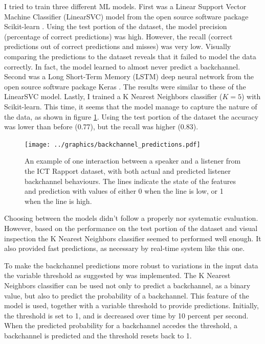 \documentclass[]{simple-thesis}
\begin{document}
I tried to train three different ML models.
First was a Linear Support Vector Machine Classifier (LinearSVC) model from the open source software package Scikit-learn \citep{Pedregosa2011}.
Using the test portion of the dataset, the model precision (percentage of correct predictions) was high.
However, the recall (correct predictions out of correct predictions and misses) was very low.
Visually comparing the predictions to the dataset reveals that it failed to model the data correctly.
In fact, the model learned to almost never predict a backchannel.
Second was a Long Short-Term Memory (LSTM) deep neural network from the open source software package Keras \citep{Chollet2015}.
The results were similar to these of the LinearSVC model.
Lastly, I trained a K Nearest Neighbors classifier ($K = 5$) with Scikit-learn.
This time, it seems that the model manage to capture the nature of the data, as shown in figure \ref{fig:system:backchannel_predictions}.
Using the test portion of the dataset the accuracy was lower than before (0.77), but the recall was higher (0.83).

\begin{figure}
  \texttt{[image: ../graphics/backchannel\_predictions.pdf]}
  \caption{An example of one interaction between a speaker and a listener from the ICT Rapport dataset, with both actual and predicted listener backchannel behaviours. The lines indicate the state of the features and prediction with values of either 0 when the line is low, or 1 when the line is high.}
  \label{fig:system:backchannel_predictions}
\end{figure}

Choosing between the models didn't follow a properly nor systematic evaluation.
However, based on the performance on the test portion of the dataset and visual inspection the K Nearest Neighbors classifier seemed to performed well enough.
It also provided fast predictions, as necessary by real-time system like this one.

To make the backchannel predictions more robust to variations in the input data the variable threshold as suggested by \cite{Kok2012} was implemented.
The K Nearest Neighbors classifier can be used not only to predict a backchannel, as a binary value, but also to predict the probability of a backchannel.
This feature of the model is used, together with a variable threshold to provide predictions.
Initially, the threshold is set to 1, and is decreased over time by 10 percent per second.
When the predicted probability for a backchannel accedes the threshold, a backchannel is predicted and the threshold resets back to 1.
\end{document}
